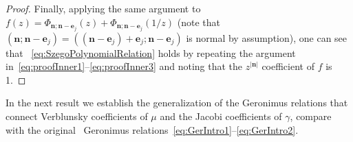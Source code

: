 \documentclass[reqno,centertags,11pt,draft]{amsart}
\begin{document}
\begin{proof}
    Finally, applying the same argument to $f(z)=\Phi_{\bm{n};\bm{n}-\bm{e}_j}(z) + \Phi_{\bm{n};\bm{n}-\bm{e}_j}(1/z)$ (note  that $(\bm{n};\bm{n}-\bm{e}_j)= ((\bm{n}-\bm{e}_j)+\bm{e}_j;\bm{n}-\bm{e}_j)$ is normal by assumption), one can see that ~\eqref{eq:SzegoPolynomialRelation} holds by repeating the argument in~\eqref{eq:proofInner1}--\eqref{eq:proofInner3} and noting that the $z^{|\bm{n}|}$ coefficient of $f$ is 1.
\end{proof}

In the next result we establish the generalization of the Geronimus relations that connect Verblunsky coefficients of $\mu$ and the Jacobi coefficients of $\gamma$, compare with the original~\cite{GeronimusRelations} Geronimus relations~\eqref{eq:GerIntro1}--\eqref{eq:GerIntro2}. %
\end{document}
